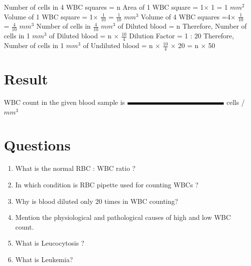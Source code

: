 \documentclass[a4paper,12pt]{book}
\begin{document}
					Number of cells in 4 WBC squares = n\newline\vspace{.2cm}
					Area of 1 WBC square = 	1$\times$ 1 	= 1 $mm^2$\newline\vspace{.2cm}
					Volume of 1 WBC square	= 1$\times$ $\frac{1}{10}$ = $\frac{1}{10}$ $mm^3$\newline\vspace{.2cm}
					Volume of 4 WBC squares =4$\times$ $\frac{1}{10}$ = $\frac{4}{10}$ $mm^3$\newline\vspace{.2cm}
					Number of cells in $\frac{4}{10}$ $mm^3$ of Diluted blood 	= n \newline\vspace{.2cm}
					Therefore, Number of cells in 1 $mm^3$ of Diluted blood = 	n $\times$ $\frac{10}{4}$\newline\vspace{.2cm}
					Dilution Factor = 1 : 20\newline\vspace{.2cm}
					Therefore, Number of cells in 1 $mm^3$ of Undiluted blood 	= n $\times$ $\frac{10}{4}$ $\times$ 20 =	n $\times$ 50\newline\vspace{.2cm}


					\section *{Result}

					WBC count in the given  blood sample is $\rule{5cm}{0.1cm}$ cells / $mm^3$

					\section*{Questions}


					\begin{enumerate}

						\item{What is the normal RBC : WBC ratio ?}
						\item{ In which condition is RBC pipette used for counting WBCs ?}
						\item{ Why is blood diluted only 20 times in WBC counting?}
						\item{ Mention the physiological and pathological causes of high and low WBC count.}
						\item{ What is Leucocytosis ?}
						\item{ What is Leukemia?}
					\end{enumerate}
\end{document}

